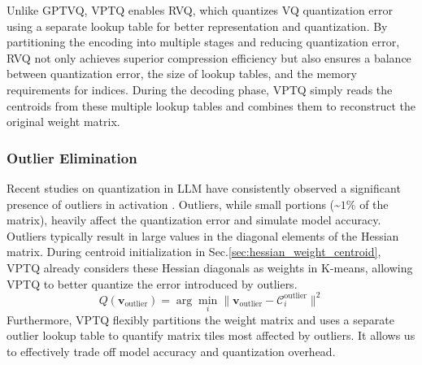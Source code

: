 Unlike GPTVQ, VPTQ enables RVQ, which quantizes VQ quantization error using a separate lookup table for better representation and quantization.
By partitioning the encoding into multiple stages and reducing quantization error, RVQ not only achieves superior compression efficiency but also ensures a balance between quantization error, the size of lookup tables, and the memory requirements for indices. 
During the decoding phase, VPTQ simply reads the centroids from these multiple lookup tables and combines them to reconstruct the original weight matrix.


\subsubsection{Outlier Elimination}
Recent studies on quantization in LLM have consistently observed a significant presence of outliers in activation \citep{SmoothQuant, awq, owq}.  
Outliers, while small portions (\textasciitilde$1\%$ of the matrix), heavily affect the quantization error and simulate model accuracy.
Outliers typically result in large values in the diagonal elements of the Hessian matrix. 
During centroid initialization in Sec.\ref{sec:hessian_weight_centroid}, VPTQ already considers these Hessian diagonals as weights in K-means, allowing VPTQ to better quantize the error introduced by outliers.
\begin{equation*}
    Q(\boldsymbol{v}_{\text{outlier}}) = \arg \min_{i} \| \boldsymbol{v}_{\text{outlier}} - \mathcal{C}^{\text{outlier}}_{i} \|^2
\end{equation*}
Furthermore, VPTQ flexibly partitions the weight matrix and uses a separate outlier lookup table to quantify matrix tiles most affected by outliers.
It allows us to effectively trade off model accuracy and quantization overhead.

